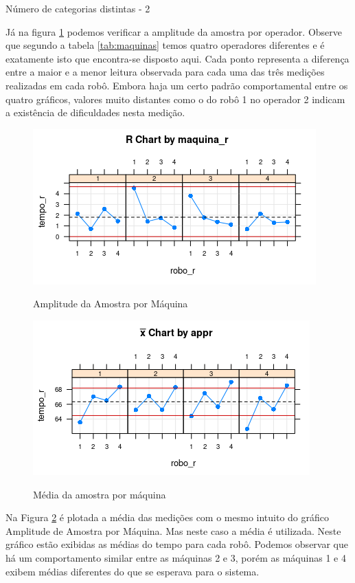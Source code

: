 \documentclass[
12pt,					%
openright,				%
oneside,				%
a4paper,				%
english,
brazil
]{ABNT/abntex2_report}
\begin{document}
Número de categorias distintas - 2

Já na figura \ref{fig:r_maquina} podemos verificar a amplitude da amostra por operador. Observe que segundo a tabela \ref{tab:maquinas} temos quatro operadores diferentes e é exatamente isto que encontra-se disposto aqui. Cada ponto representa a diferença entre a maior e a menor leitura observada para cada uma das três medições realizadas em cada robô. Embora haja um certo padrão comportamental entre os quatro gráficos, valores muito distantes como o do robô 1 no operador 2 indicam a existência de dificuldades nesta medição. 
\begin{figure}[H]
	\caption{Amplitude da Amostra por Máquina}
	\includegraphics[]{figures/graf3.png}
	\label{fig:r_maquina}
\end{figure}


\begin{figure}[H]
	\centering
	\caption{Média da amostra por máquina}
	\includegraphics[scale = 1]{figures/graf5.png}
	\label{fig:graf5}
\end{figure}

Na Figura \ref{fig:graf5} é plotada a média das medições com o mesmo intuito do gráfico Amplitude de Amostra por Máquina. Mas neste caso a média é utilizada. Neste gráfico estão exibidas as médias do tempo para cada robô. Podemos observar que há um comportamento similar entre as máquinas 2 e 3, porém as máquinas 1 e 4 exibem médias diferentes do que se esperava para o
sistema.
\end{document}
